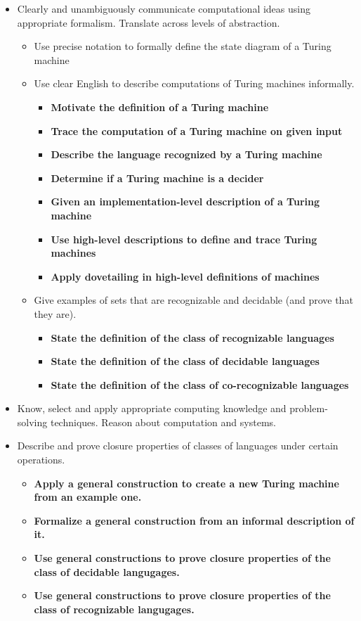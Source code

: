 \begin{itemize}
    \item Clearly and unambiguously communicate computational ideas using appropriate formalism. Translate across levels of abstraction.
    \begin{itemize}
        \item Use precise notation to formally define the state diagram of a Turing machine
        \item Use clear English to describe computations of Turing machines informally.
        \begin{itemize}
                \item {\bf Motivate the definition of a Turing machine}
                \item {\bf Trace the computation of a Turing machine on given input}
                \item {\bf Describe the language recognized by a Turing machine}
                \item {\bf Determine if a Turing machine is a decider}
                \item {\bf Given an implementation-level description of a Turing machine}
                \item {\bf Use high-level descriptions to define and trace Turing machines}
                \item {\bf Apply dovetailing in high-level definitions of machines}
         \end{itemize}
       \item Give examples of sets that are recognizable and decidable (and prove that they are).
       \begin{itemize}
          \item {\bf State the definition of the class of recognizable languages}
          \item {\bf State the definition of the class of decidable languages}
          \item {\bf State the definition of the class of co-recognizable languages}
       \end{itemize}
    \end{itemize}
    \item Know, select and apply appropriate computing knowledge and problem-solving techniques. 
    Reason about computation and systems.
    \item Describe and prove closure properties of classes of languages under certain operations.
    \begin{itemize}
        \item {\bf Apply a general construction to create a new Turing machine from an example one.}
        \item {\bf Formalize a general construction from an informal description of it.}
        \item {\bf Use general constructions to prove closure properties of the class of decidable langugages.}
        \item {\bf Use general constructions to prove closure properties of the class of recognizable langugages.}
    \end{itemize}
\end{itemize}

